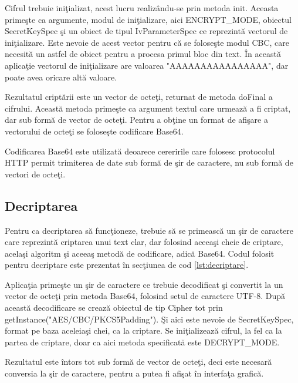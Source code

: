 \lstset{caption=Cod folosit pentru criptare,label=lst:criptare}


Cifrul trebuie ini\c{t}ializat, acest lucru realiz\^{a}ndu-se prin metoda init. Aceasta prime\c{s}te ca argumente, modul de ini\c{t}ializare, aici ENCRYPT_MODE, obiectul SecretKeySpec \c{s}i un obiect de tipul IvParameterSpec ce reprezint\u{a} vectorul de ini\c{t}ializare. Este nevoie de acest vector pentru c\u{a} se folose\c{s}te modul CBC, care necesit\u{a} un astfel de obiect pentru a procesa primul bloc din text. \^{I}n aceast\u{a} aplica\c{t}ie vectorul de ini\c{t}ializare are valoarea "AAAAAAAAAAAAAAAA", dar poate avea oricare alt\u{a} valoare.

Rezultatul cript\u{a}rii este un vector de octe\c{t}i, returnat de metoda doFinal a cifrului. Aceast\u{a} metoda prime\c{s}te ca argument textul care urmeaz\u{a} a fi criptat, dar sub form\u{a} de vector de octe\c{t}i. Pentru a ob\c{t}ine un format de afi\c{s}are a vectorului de octe\c{t}i se folose\c{s}te codificare Base64.

Codificarea Base64 este utilizat\u{a} deoarece cereririle care folosesc protocolul HTTP permit trimiterea de date sub form\u{a} de \c{s}ir de caractere, nu sub form\u{a} de vectori de octe\c{t}i.

\subsection{Decriptarea}

Pentru ca decriptarea s\u{a} func\c{t}ioneze, trebuie s\u{a} se primeasc\u{a} un \c{s}ir de caractere care reprezint\u{a} criptarea unui text clar, dar folosind aceea\c{s}i cheie de criptare, acela\c{s}i algoritm \c{s}i aceea\c{s} metod\u{a} de codificare, adic\u{a} Base64. Codul folosit pentru decriptare este prezentat \^{i}n sec\c{t}iunea de cod \ref{lst:decriptare}.

\lstset{caption=Cod folosit pentru decriptare,
label=lst:decriptare}
 

Aplica\c{t}ia prime\c{s}te un \c{s}ir de caractere ce trebuie decodificat \c{s}i convertit la un vector de octe\c{t}i prin metoda Base64, folosind setul de caractere UTF-8. Dup\u{a} aceast\u{a} decodificare se creaz\u{a} obiectul de tip Cipher tot prin getInstance("AES/CBC/PKCS5Padding"). \c{S}i aici este nevoie de  SecretKeySpec, format pe baza aceleia\c{s}i chei, ca la criptare. Se ini\c{t}ializeaz\u{a} cifrul, la fel ca la partea de criptare, doar ca aici metoda specificat\u{a} este DECRYPT_MODE.

Rezultatul este \^{i}ntors tot sub form\u{a} de vector de octe\c{t}i, deci este necesar\u{a} conversia la \c{s}ir de caractere, pentru a putea fi afi\c{s}at \^{i}n interfa\c{t}a grafic\u{a}.

 